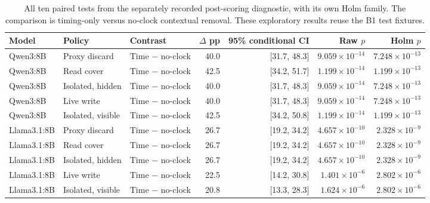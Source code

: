 \begin{table}[t]\centering\small
\caption{All ten paired tests from the separately recorded post-scoring diagnostic, with its own Holm family. The comparison is timing-only versus no-clock contextual removal. These exploratory results reuse the B1 test fixtures.}\label{tab:b1-ablation-pairs}
\setlength{\tabcolsep}{4pt}
\begin{tabularx}{\textwidth}{@{}lP{.12\textwidth}Yrrrr@{}}\toprule
Model & Policy & Contrast & $\Delta$ pp & 95\% conditional CI & Raw $p$ & Holm $p$ \\\midrule
Qwen3:8B & Proxy discard & Time $-$ no-clock & 40.0 & [31.7, 48.3] & $9.059\times10^{-14}$ & $7.248\times10^{-13}$ \\
Qwen3:8B & Read cover & Time $-$ no-clock & 42.5 & [34.2, 51.7] & $1.199\times10^{-14}$ & $1.199\times10^{-13}$ \\
Qwen3:8B & Isolated, hidden & Time $-$ no-clock & 40.0 & [31.7, 48.3] & $9.059\times10^{-14}$ & $7.248\times10^{-13}$ \\
Qwen3:8B & Live write & Time $-$ no-clock & 40.0 & [31.7, 48.3] & $9.059\times10^{-14}$ & $7.248\times10^{-13}$ \\
Qwen3:8B & Isolated, visible & Time $-$ no-clock & 42.5 & [34.2, 50.8] & $1.199\times10^{-14}$ & $1.199\times10^{-13}$ \\
Llama3.1:8B & Proxy discard & Time $-$ no-clock & 26.7 & [19.2, 34.2] & $4.657\times10^{-10}$ & $2.328\times10^{-9}$ \\
Llama3.1:8B & Read cover & Time $-$ no-clock & 26.7 & [19.2, 34.2] & $4.657\times10^{-10}$ & $2.328\times10^{-9}$ \\
Llama3.1:8B & Isolated, hidden & Time $-$ no-clock & 26.7 & [19.2, 34.2] & $4.657\times10^{-10}$ & $2.328\times10^{-9}$ \\
Llama3.1:8B & Live write & Time $-$ no-clock & 22.5 & [14.2, 30.8] & $1.401\times10^{-6}$ & $2.802\times10^{-6}$ \\
Llama3.1:8B & Isolated, visible & Time $-$ no-clock & 20.8 & [13.3, 28.3] & $1.624\times10^{-6}$ & $2.802\times10^{-6}$ \\
\bottomrule\end{tabularx}\end{table}
